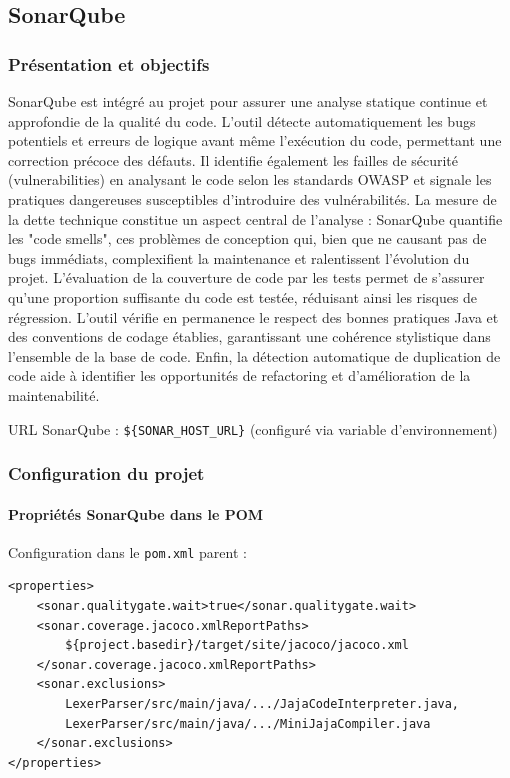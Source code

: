\subsection{SonarQube}

\subsubsection{Présentation et objectifs}

SonarQube est intégré au projet pour assurer une analyse statique continue et approfondie de la qualité du code. L'outil détecte automatiquement les bugs potentiels et erreurs de logique avant même l'exécution du code, permettant une correction précoce des défauts. Il identifie également les failles de sécurité (vulnerabilities) en analysant le code selon les standards OWASP et signale les pratiques dangereuses susceptibles d'introduire des vulnérabilités. La mesure de la dette technique constitue un aspect central de l'analyse : SonarQube quantifie les "code smells", ces problèmes de conception qui, bien que ne causant pas de bugs immédiats, complexifient la maintenance et ralentissent l'évolution du projet. L'évaluation de la couverture de code par les tests permet de s'assurer qu'une proportion suffisante du code est testée, réduisant ainsi les risques de régression. L'outil vérifie en permanence le respect des bonnes pratiques Java et des conventions de codage établies, garantissant une cohérence stylistique dans l'ensemble de la base de code. Enfin, la détection automatique de duplication de code aide à identifier les opportunités de refactoring et d'amélioration de la maintenabilité.

URL SonarQube : \texttt{\$\{SONAR\_HOST\_URL\}} (configuré via variable d'environnement)

\subsubsection{Configuration du projet}

\paragraph{Propriétés SonarQube dans le POM}

Configuration dans le \texttt{pom.xml} parent :
\begin{lstlisting}[language=enhancedxml, caption=Configuration SonarQube]
<properties>
    <sonar.qualitygate.wait>true</sonar.qualitygate.wait>
    <sonar.coverage.jacoco.xmlReportPaths>
        ${project.basedir}/target/site/jacoco/jacoco.xml
    </sonar.coverage.jacoco.xmlReportPaths>
    <sonar.exclusions>
        LexerParser/src/main/java/.../JajaCodeInterpreter.java,
        LexerParser/src/main/java/.../MiniJajaCompiler.java
    </sonar.exclusions>
</properties>
\end{lstlisting}


